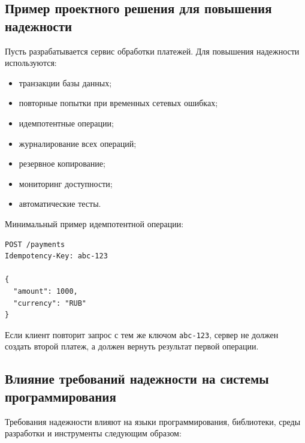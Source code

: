 \documentclass[12pt,a4paper]{article}
\begin{document}
\subsection{Пример проектного решения для повышения надежности}

Пусть разрабатывается сервис обработки платежей. Для повышения надежности используются:
\begin{itemize}
    \item транзакции базы данных;
    \item повторные попытки при временных сетевых ошибках;
    \item идемпотентные операции;
    \item журналирование всех операций;
    \item резервное копирование;
    \item мониторинг доступности;
    \item автоматические тесты.
\end{itemize}

Минимальный пример идемпотентной операции:

\begin{verbatim}
POST /payments
Idempotency-Key: abc-123

{
  "amount": 1000,
  "currency": "RUB"
}
\end{verbatim}

Если клиент повторит запрос с тем же ключом \texttt{abc-123}, сервер не должен создать второй платеж, а должен вернуть результат первой операции.

\subsection{Влияние требований надежности на системы программирования}

Требования надежности влияют на языки программирования, библиотеки, среды разработки и инструменты следующим образом:
\end{document}
